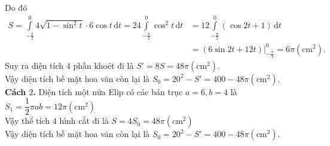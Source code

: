 \begin{ex}
{{
		}
		\noindent Do đó
		\begin{align*}
			S=\displaystyle\int\limits_{-\tfrac{\pi}{2}}^0 4\sqrt{1-\sin^2t} \cdot 6\cos t\mathrm{\,d}t=24\displaystyle\int\limits_{-\tfrac{\pi}{2}}^0 \cos^2t\mathrm{\,d}t&=12\displaystyle\int\limits_{-\tfrac{\pi}{2}}^0 (\cos 2t+1)\mathrm{\,d}t\\ &=\left(6\sin 2t+12t\right)\bigg|_{-\tfrac{\pi}{2}}^0=6\pi (\text{cm}^2).
		\end{align*}
		Suy ra diện tích $4$ phần khoét đi là $S'=8S=48\pi (\text{cm}^2)$.\\
		Vậy diện tích bề mặt hoa văn còn lại là $S_0=20^2-S'=400-48\pi (\text{cm}^2)$. \\
		\textbf{Cách $ 2 $.} Diện tích một nửa Elip có các bán trục $a=6,b=4$ là $S_1=\dfrac{1}{2}\pi ab=12\pi (\text{cm}^2)$ \\
		Vậy thể tích $4$ hình cắt đi là $S=4S_0=48\pi (\text{cm}^2)$ \\
		Vậy diện tích bề mặt hoa văn còn lại là $S_0=20^2-S'=400-48\pi (\text{cm}^2)$.}
\end{ex}
